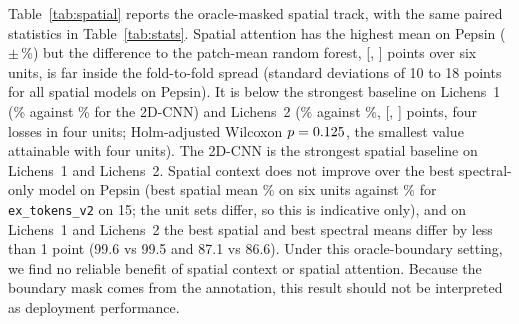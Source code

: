 \documentclass[journal]{IEEEtran}
\begin{document}
Table~\ref{tab:spatial} reports the oracle-masked spatial track, with the same paired statistics in Table~\ref{tab:stats}. Spatial attention has the highest mean on Pepsin (\BestOursAccPepsinSpatial\,$\pm$\,\BestOursStdPepsinSpatial\%) but the difference to the patch-mean random forest, \GapPepsinSpatial{} [\GapLoPepsinSpatial, \GapHiPepsinSpatial] points over six units, is far inside the fold-to-fold spread (standard deviations of 10 to 18 points for all spatial models on Pepsin). It is below the strongest baseline on Lichens~1 (\BestOursAccLichensOneSpatial\% against \BestBaseAccLichensOneSpatial\% for the 2D-CNN) and Lichens~2 (\BestOursAccLichensTwoSpatial\% against \BestBaseAccLichensTwoSpatial\%, \GapLichensTwoSpatial{} [\GapLoLichensTwoSpatial, \GapHiLichensTwoSpatial] points, four losses in four units; Holm-adjusted Wilcoxon $p=0.125$, the smallest value attainable with four units). The 2D-CNN is the strongest spatial baseline on Lichens~1 and Lichens~2. Spatial context does not improve over the best spectral-only model on Pepsin (best spatial mean \BestOursAccPepsinSpatial\% on six units against \BestOursAccPepsinSpectral\% for \texttt{ex\_tokens\_v2} on 15; the unit sets differ, so this is indicative only), and on Lichens~1 and Lichens~2 the best spatial and best spectral means differ by less than 1 point (99.6 vs 99.5 and 87.1 vs 86.6). Under this oracle-boundary setting, we find no reliable benefit of spatial context or spatial attention. Because the boundary mask comes from the annotation, this result should not be interpreted as deployment performance.
\end{document}
